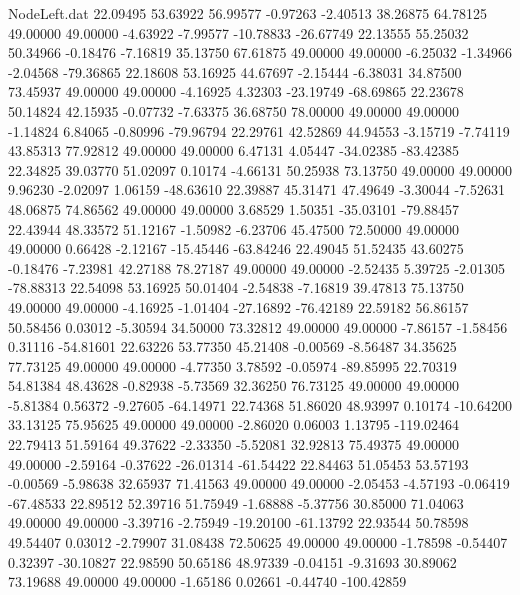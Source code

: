 \begin{filecontents}{NodeLeft.dat}
  22.09495   53.63922   56.99577    -0.97263   -2.40513   38.26875   64.78125   49.00000   49.00000   -4.63922   -7.99577  -10.78833  -26.67749
  22.13555   55.25032   50.34966    -0.18476   -7.16819   35.13750   67.61875   49.00000   49.00000   -6.25032   -1.34966   -2.04568  -79.36865
  22.18608   53.16925   44.67697    -2.15444   -6.38031   34.87500   73.45937   49.00000   49.00000   -4.16925    4.32303  -23.19749  -68.69865
  22.23678   50.14824   42.15935    -0.07732   -7.63375   36.68750   78.00000   49.00000   49.00000   -1.14824    6.84065   -0.80996  -79.96794
  22.29761   42.52869   44.94553    -3.15719   -7.74119   43.85313   77.92812   49.00000   49.00000    6.47131    4.05447  -34.02385  -83.42385
  22.34825   39.03770   51.02097     0.10174   -4.66131   50.25938   73.13750   49.00000   49.00000    9.96230   -2.02097    1.06159  -48.63610
  22.39887   45.31471   47.49649    -3.30044   -7.52631   48.06875   74.86562   49.00000   49.00000    3.68529    1.50351  -35.03101  -79.88457
  22.43944   48.33572   51.12167    -1.50982   -6.23706   45.47500   72.50000   49.00000   49.00000    0.66428   -2.12167  -15.45446  -63.84246
  22.49045   51.52435   43.60275    -0.18476   -7.23981   42.27188   78.27187   49.00000   49.00000   -2.52435    5.39725   -2.01305  -78.88313
  22.54098   53.16925   50.01404    -2.54838   -7.16819   39.47813   75.13750   49.00000   49.00000   -4.16925   -1.01404  -27.16892  -76.42189
  22.59182   56.86157   50.58456     0.03012   -5.30594   34.50000   73.32812   49.00000   49.00000   -7.86157   -1.58456    0.31116  -54.81601
  22.63226   53.77350   45.21408    -0.00569   -8.56487   34.35625   77.73125   49.00000   49.00000   -4.77350    3.78592   -0.05974  -89.85995
  22.70319   54.81384   48.43628    -0.82938   -5.73569   32.36250   76.73125   49.00000   49.00000   -5.81384    0.56372   -9.27605  -64.14971
  22.74368   51.86020   48.93997     0.10174  -10.64200   33.13125   75.95625   49.00000   49.00000   -2.86020    0.06003    1.13795 -119.02464
  22.79413   51.59164   49.37622    -2.33350   -5.52081   32.92813   75.49375   49.00000   49.00000   -2.59164   -0.37622  -26.01314  -61.54422
  22.84463   51.05453   53.57193    -0.00569   -5.98638   32.65937   71.41563   49.00000   49.00000   -2.05453   -4.57193   -0.06419  -67.48533
  22.89512   52.39716   51.75949    -1.68888   -5.37756   30.85000   71.04063   49.00000   49.00000   -3.39716   -2.75949  -19.20100  -61.13792
  22.93544   50.78598   49.54407     0.03012   -2.79907   31.08438   72.50625   49.00000   49.00000   -1.78598   -0.54407    0.32397  -30.10827
  22.98590   50.65186   48.97339    -0.04151   -9.31693   30.89062   73.19688   49.00000   49.00000   -1.65186    0.02661   -0.44740 -100.42859

\end{filecontents}
